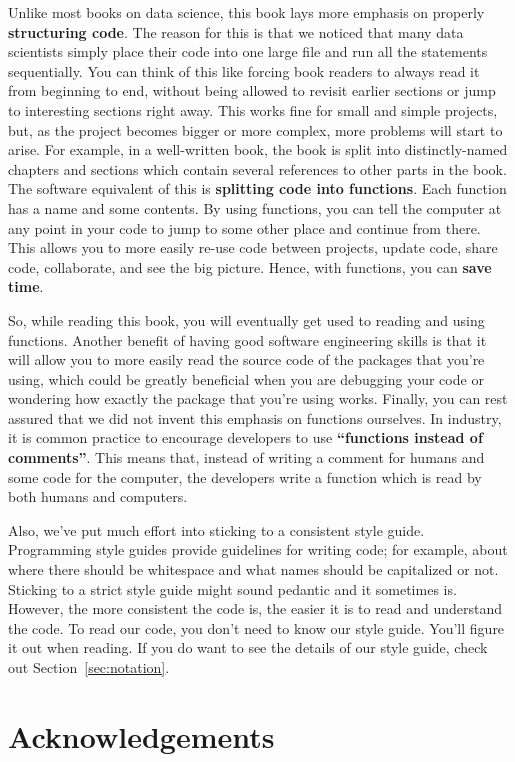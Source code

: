 \documentclass[
  notoc %
]{tufte-book}
\begin{document}
Unlike most books on data science, this book lays more emphasis on
properly \textbf{structuring code}. The reason for this is that we
noticed that many data scientists simply place their code into one large
file and run all the statements sequentially. You can think of this like
forcing book readers to always read it from beginning to end, without
being allowed to revisit earlier sections or jump to interesting
sections right away. This works fine for small and simple projects, but,
as the project becomes bigger or more complex, more problems will start
to arise. For example, in a well-written book, the book is split into
distinctly-named chapters and sections which contain several references
to other parts in the book. The software equivalent of this is
\textbf{splitting code into functions}. Each function has a name and
some contents. By using functions, you can tell the computer at any
point in your code to jump to some other place and continue from there.
This allows you to more easily re-use code between projects, update
code, share code, collaborate, and see the big picture. Hence, with
functions, you can \textbf{save time}.

So, while reading this book, you will eventually get used to reading and
using functions. Another benefit of having good software engineering
skills is that it will allow you to more easily read the source code of
the packages that you're using, which could be greatly beneficial when
you are debugging your code or wondering how exactly the package that
you're using works. Finally, you can rest assured that we did not invent
this emphasis on functions ourselves. In industry, it is common practice
to encourage developers to use \textbf{``functions instead of
comments''}. This means that, instead of writing a comment for humans
and some code for the computer, the developers write a function which is
read by both humans and computers.

Also, we've put much effort into sticking to a consistent style guide.
Programming style guides provide guidelines for writing code; for
example, about where there should be whitespace and what names should be
capitalized or not. Sticking to a strict style guide might sound
pedantic and it sometimes is. However, the more consistent the code is,
the easier it is to read and understand the code. To read our code, you
don't need to know our style guide. You'll figure it out when reading.
If you do want to see the details of our style guide, check out
Section~\ref{sec:notation}.

\hypertarget{acknowledgements}{%
\section{Acknowledgements}\label{acknowledgements}}
\end{document}
